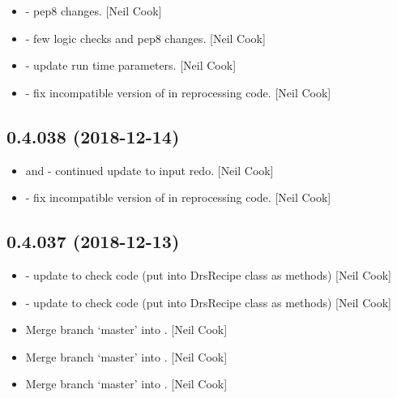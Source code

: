\documentclass[a4paper,10pt,english]{report}
\begin{document}
\begin{itemize}
\item {} 
 - pep8 changes. {[}Neil Cook{]}

\item {} 
 - few logic checks and pep8 changes. {[}Neil
Cook{]}

\item {} 
 - update run time parameters. {[}Neil Cook{]}

\item {} 
 - fix incompatible version of  in
reprocessing code. {[}Neil Cook{]}

\end{itemize}


\subsection{0.4.038 (2018-12-14)}
\label{\detokenize{misc/changelog:id233}}\begin{itemize}
\item {} 
 and  - continued update to input
redo. {[}Neil Cook{]}

\item {} 
 - fix incompatible version of  in
reprocessing code. {[}Neil Cook{]}

\end{itemize}


\subsection{0.4.037 (2018-12-13)}
\label{\detokenize{misc/changelog:id234}}\begin{itemize}
\item {} 
 - update to check code (put into DrsRecipe class as
methods) {[}Neil Cook{]}

\item {} 
 - update to check code (put into DrsRecipe class as
methods) {[}Neil Cook{]}

\item {} 
Merge branch ‘master’ into . {[}Neil Cook{]}

\item {} 
Merge branch ‘master’ into . {[}Neil Cook{]}

\item {} 
Merge branch ‘master’ into . {[}Neil Cook{]}

\end{itemize}
\end{document}
